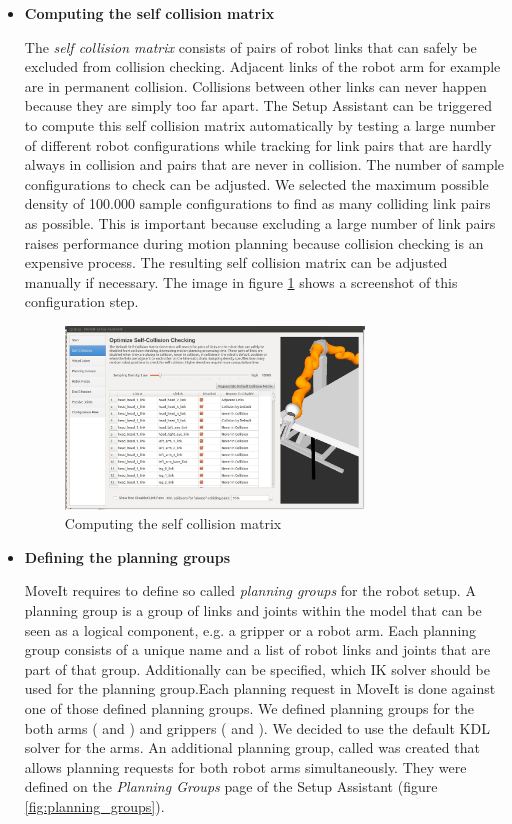\begin{itemize}

\item \textbf{Computing the self collision matrix}

The \emph{self collision matrix} consists of pairs of robot links that can safely be excluded from collision checking. Adjacent links of the robot arm for example are in permanent collision. Collisions between other links can never happen because they are simply too far apart. The Setup Assistant can be triggered to compute this self collision matrix automatically by testing a large number of different robot configurations while tracking for link pairs that are hardly always in collision and pairs that are never in collision. The number of sample configurations to check can be adjusted. We selected the maximum possible density of 100.000 sample configurations to find as many colliding link pairs as possible. This is important because excluding a large number of link pairs raises performance during motion planning because collision checking is an expensive process. The resulting self collision matrix can be adjusted manually if necessary. The image in figure \ref{fig:self_col} shows a screenshot of this configuration step.

\begin{figure}[hp]
	\centering
  	\includegraphics[width=0.75\textwidth]{images/self_collision.jpg}
	\caption{Computing the self collision matrix}
	\label{fig:self_col}
\end{figure}

\item \textbf{Defining the planning groups}

MoveIt requires to define so called \emph{planning groups} for the robot setup. A planning group is a group of links and joints within the model that can be seen as a logical component, e.g. a gripper or a robot arm. Each planning group consists of a unique name and a list of robot links and joints that are part of that group. Additionally can be specified, which IK solver should be used for the planning group.Each planning request in MoveIt is done against one of those defined planning groups. We defined planning groups for the both arms ( and ) and grippers ( and ). We decided to use the default KDL solver for the arms. An additional planning group, called  was created that allows planning requests for both robot arms simultaneously. They were defined on the \emph{Planning Groups} page of the Setup Assistant (figure \ref{fig:planning_groups}).


\end{itemize}
